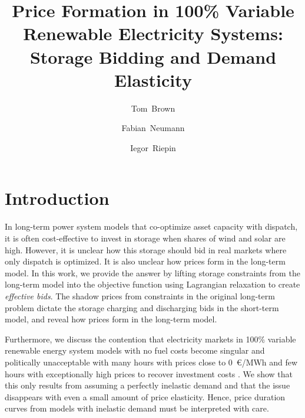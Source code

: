 \documentclass[final,3p]{elsarticle}
\begin{document}
\begin{frontmatter}

	\title{Price Formation in 100\% Variable Renewable Electricity Systems:\\Storage Bidding and Demand Elasticity}

	\author[tub]{Tom~Brown}
	\author[tub]{Fabian~Neumann}
	\author[tub]{Iegor~Riepin}

	\address[tub]{Department of Digital Transformation in Energy Systems, Institute of Energy Technology, Technische Universität Berlin (TUB), Einsteinufer 25 (TA 8), 10587, Berlin, Germany}


  \end{frontmatter}

\section*{Introduction}

In long-term power system models that co-optimize asset capacity with dispatch,
it is often cost-effective to invest in storage when shares of wind and solar
are high. However, it is unclear how this storage should bid in real markets
where only dispatch is optimized. It is also unclear how prices form in the
long-term model. In this work, we provide the answer by lifting storage
constraints from the long-term model into the objective function using
Lagrangian relaxation to create \textit{effective bids}. The shadow prices from
constraints in the original long-term problem dictate the storage charging and
discharging bids in the short-term model, and reveal how prices form in the
long-term model.

Furthermore, we discuss the contention that electricity markets in 100\%
variable renewable energy system models with no fuel costs become singular and
politically unacceptable with many hours with prices close to 0~\euro/MWh and
few hours with exceptionally high prices to recover investment costs
\cite{jungePropertiesDeeply2022}. We show that this only results from assuming a
perfectly inelastic demand and that the issue disappears with even a small
amount of price elasticity. Hence, price duration curves from models with
inelastic demand must be interpreted with care.
\end{document}
